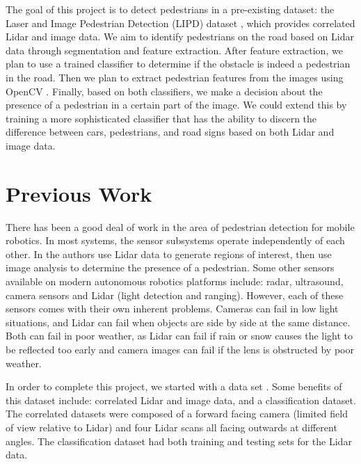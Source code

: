 \documentclass[10pt,twocolumn,letterpaper]{article}
\begin{document}
  The goal of this project is to detect pedestrians in a pre-existing dataset:
  the Laser and Image Pedestrian Detection (LIPD) dataset \cite{dataset},
  which provides correlated Lidar and image data. We aim to identify pedestrians
  on the road based on Lidar data through segmentation and feature extraction.
  After feature extraction, we plan to use a trained classifier to determine
  if the obstacle is indeed a pedestrian in the road. Then we plan to extract
  pedestrian features from the images using OpenCV \cite{opencv}. Finally,
  based on both classifiers, we make a decision about the presence of a
  pedestrian in a certain part of the image. We could extend this by
  training a more sophisticated classifier that has the ability to discern the
  difference between cars, pedestrians, and road signs based on both Lidar
  and image data.

\section{Previous Work}

  There has been a good deal of work in the area of pedestrian detection for
  mobile robotics. In most systems, the sensor subsystems operate independently
  of each other. In \cite{journal} the authors use Lidar data to generate regions
  of interest, then use image analysis to determine the presence of a
  pedestrian. Some other sensors available on modern autonomous robotics
  platforms include: radar, ultrasound, camera sensors and Lidar (light
  detection and ranging). However, each of these sensors comes with their own
  inherent problems. Cameras can fail in low light situations, and Lidar can
  fail when objects are side by side at the same distance. Both can fail in poor
  weather, as Lidar can fail if rain or snow causes the light to be reflected
  too early and camera images can fail if the lens is obstructed by poor weather.

  In order to complete this project, we started with a data set \cite{dataset}.
  Some benefits of this dataset include: correlated Lidar and image data, and
  a classification dataset. The correlated datasets were composed of a forward
  facing camera (limited field of view relative to Lidar) and four Lidar scans
  all facing outwards at different angles. The classification dataset had both
  training and testing sets for the Lidar data.


\end{document}
